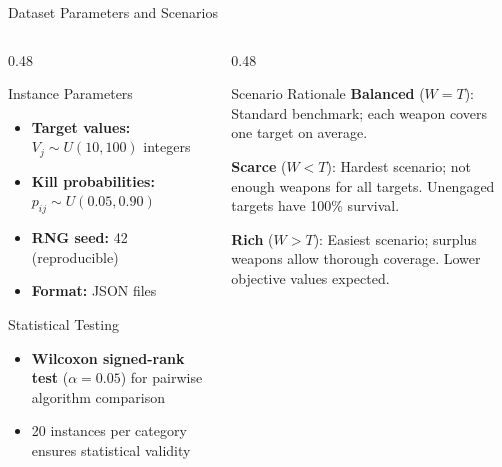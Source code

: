 \documentclass[aspectratio=169,10pt]{beamer}
\begin{document}
\begin{frame}{Dataset Parameters and Scenarios}
  \begin{columns}[t]

    \begin{column}{0.48\textwidth}
      \begin{block}{Instance Parameters}
        \begin{itemize}
          \item[\color{goldaccent}$\blacktriangleright$] \textbf{Target values:} $V_j \sim U(10, 100)$ integers
          \item[\color{goldaccent}$\blacktriangleright$] \textbf{Kill probabilities:} $p_{ij} \sim U(0.05, 0.90)$
          \item[\color{goldaccent}$\blacktriangleright$] \textbf{RNG seed:} 42 (reproducible)
          \item[\color{goldaccent}$\blacktriangleright$] \textbf{Format:} JSON files
        \end{itemize}
      \end{block}

      \begin{exampleblock}{Statistical Testing}
        \begin{itemize}
          \item[\color{goldaccent}$\blacktriangleright$] \textbf{Wilcoxon signed-rank test} ($\alpha = 0.05$) for pairwise algorithm comparison
          \item[\color{goldaccent}$\blacktriangleright$] 20 instances per category ensures statistical validity
        \end{itemize}
      \end{exampleblock}
    \end{column}

    \begin{column}{0.48\textwidth}
      \begin{alertblock}{Scenario Rationale}
        \textbf{Balanced} ($W = T$): Standard benchmark; each weapon covers one target on average.

        \vspace{0.2cm}
        \textbf{Scarce} ($W < T$): Hardest scenario; not enough weapons for all targets. Unengaged targets have 100\% survival.

        \vspace{0.2cm}
        \textbf{Rich} ($W > T$): Easiest scenario; surplus weapons allow thorough coverage. Lower objective values expected.
      \end{alertblock}
    \end{column}

  \end{columns}
\end{frame}
\end{document}
